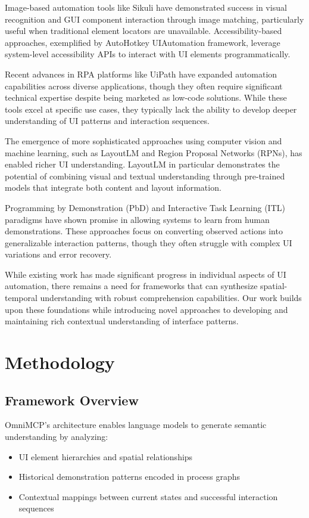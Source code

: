 \documentclass{article}
\begin{document}
Image-based automation tools like Sikuli have demonstrated success in visual recognition and GUI component interaction through image matching, particularly useful when traditional element locators are unavailable. Accessibility-based approaches, exemplified by AutoHotkey UIAutomation framework, leverage system-level accessibility APIs to interact with UI elements programmatically.

Recent advances in RPA platforms like UiPath have expanded automation capabilities across diverse applications, though they often require significant technical expertise despite being marketed as low-code solutions. While these tools excel at specific use cases, they typically lack the ability to develop deeper understanding of UI patterns and interaction sequences.

The emergence of more sophisticated approaches using computer vision and machine learning, such as LayoutLM and Region Proposal Networks (RPNs), has enabled richer UI understanding. LayoutLM in particular demonstrates the potential of combining visual and textual understanding through pre-trained models that integrate both content and layout information.

Programming by Demonstration (PbD) and Interactive Task Learning (ITL) paradigms have shown promise in allowing systems to learn from human demonstrations. These approaches focus on converting observed actions into generalizable interaction patterns, though they often struggle with complex UI variations and error recovery.

While existing work has made significant progress in individual aspects of UI automation, there remains a need for frameworks that can synthesize spatial-temporal understanding with robust comprehension capabilities. Our work builds upon these foundations while introducing novel approaches to developing and maintaining rich contextual understanding of interface patterns.

\section{Methodology}

\subsection{Framework Overview}
OmniMCP's architecture enables language models to generate semantic understanding by analyzing:
\begin{itemize}
    \item UI element hierarchies and spatial relationships
    \item Historical demonstration patterns encoded in process graphs
    \item Contextual mappings between current states and successful interaction sequences
\end{itemize}
\end{document}
